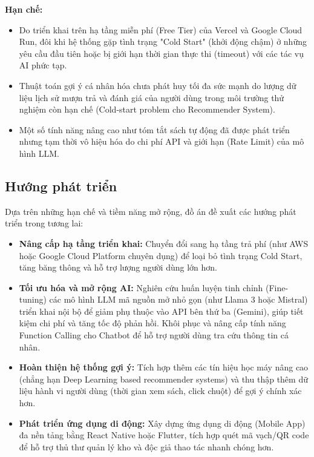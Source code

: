 \textbf{Hạn chế:}
\begin{itemize}
    \item Do triển khai trên hạ tầng miễn phí (Free Tier) của Vercel và Google Cloud Run, đôi khi hệ thống gặp tình trạng "Cold Start" (khởi động chậm) ở những yêu cầu đầu tiên hoặc bị giới hạn thời gian thực thi (timeout) với các tác vụ AI phức tạp.
    \item Thuật toán gợi ý cá nhân hóa chưa phát huy tối đa sức mạnh do lượng dữ liệu lịch sử mượn trả và đánh giá của người dùng trong môi trường thử nghiệm còn hạn chế (Cold-start problem cho Recommender System).
    \item Một số tính năng nâng cao như tóm tắt sách tự động đã được phát triển nhưng tạm thời vô hiệu hóa do chi phí API và giới hạn (Rate Limit) của mô hình LLM.
\end{itemize}

\subsection{Hướng phát triển}
Dựa trên những hạn chế và tiềm năng mở rộng, đồ án đề xuất các hướng phát triển trong tương lai:
\begin{itemize}
    \item \textbf{Nâng cấp hạ tầng triển khai:} Chuyển đổi sang hạ tầng trả phí (như AWS hoặc Google Cloud Platform chuyên dụng) để loại bỏ tình trạng Cold Start, tăng băng thông và hỗ trợ lượng người dùng lớn hơn.
    \item \textbf{Tối ưu hóa và mở rộng AI:} Nghiên cứu huấn luyện tinh chỉnh (Fine-tuning) các mô hình LLM mã nguồn mở nhỏ gọn (như Llama 3 hoặc Mistral) triển khai nội bộ để giảm phụ thuộc vào API bên thứ ba (Gemini), giúp tiết kiệm chi phí và tăng tốc độ phản hồi. Khôi phục và nâng cấp tính năng Function Calling cho Chatbot để hỗ trợ người dùng tra cứu thông tin cá nhân.
    \item \textbf{Hoàn thiện hệ thống gợi ý:} Tích hợp thêm các tín hiệu học máy nâng cao (chẳng hạn Deep Learning based recommender systems) và thu thập thêm dữ liệu hành vi người dùng (thời gian xem sách, click chuột) để gợi ý chính xác hơn.
    \item \textbf{Phát triển ứng dụng di động:} Xây dựng ứng dụng di động (Mobile App) đa nền tảng bằng React Native hoặc Flutter, tích hợp quét mã vạch/QR code để hỗ trợ thủ thư quản lý kho và độc giả thao tác nhanh chóng hơn.
\end{itemize}
